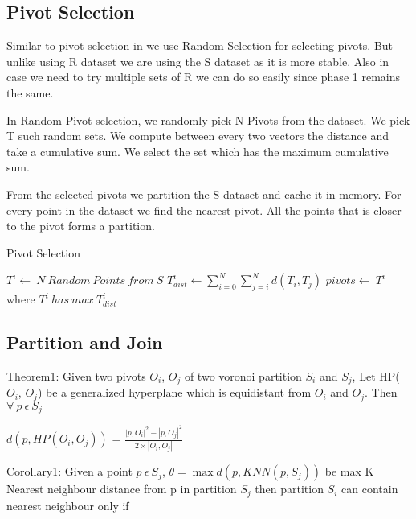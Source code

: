 \documentclass[12pt]{article}
\begin{document}
\subsection{Pivot Selection}
Similar to pivot selection in \cite{lu_efficient_2012} we use Random
Selection for selecting pivots. But unlike using R dataset we are
using the S dataset as it is more stable. Also in case we need to try
multiple sets of R we can do so easily since phase 1 remains the
same.

In Random Pivot selection, we randomly pick N Pivots from the
dataset. We pick T such random sets. We compute between every two
vectors the distance and take a cumulative sum. We select the set
which has the maximum cumulative sum.

From the selected pivots we partition the S dataset and cache it in
memory. For every point in the dataset we find the nearest pivot. All
the points that is closer to the pivot forms a partition.

\begin{algorithm}
  \caption{Pivot Selection}
  \label{algo_pivot_selection}
  \begin{algorithmic}[1]
    \STATE $T^i  \leftarrow \ N\ Random\ Points\ from\ S$
    \STATE $T_{dist}^i \leftarrow \sum\limits_{i=0}^N\sum\limits_{j=i}^N d(T_i, T_j)$
    \ENDFOR
    \STATE $pivots \leftarrow\ T^i$ where $T^i\ has\ max\ T^i_{dist}$
  \end{algorithmic}
\end{algorithm}

\subsection{Partition and Join}

\bigskip

Theorem1: \cite{lu_efficient_2012} Given two pivots $O_i$, $O_j$ of two voronoi
partition $S_i$ and $S_j$, Let HP($O_i$, $O_j$) be a generalized
hyperplane which is equidistant from $O_i$ and $O_j$. Then $\forall\ p\
\epsilon\ S_j$

\medskip

$d(p, HP(O_i, O_j))$ = $\frac{|p,O_i|^2 - |p,O_j|^2}{2 \times |O_i, O_j|}$

\bigskip

Corollary1: Given a point $p\ \epsilon\ S_j$, $\theta = \max{d(p, KNN(p, S_j))}$ be max K Nearest
neighbour distance from p in partition $S_j$ then partition
$S_i$ can contain nearest neighbour only if
\end{document}
